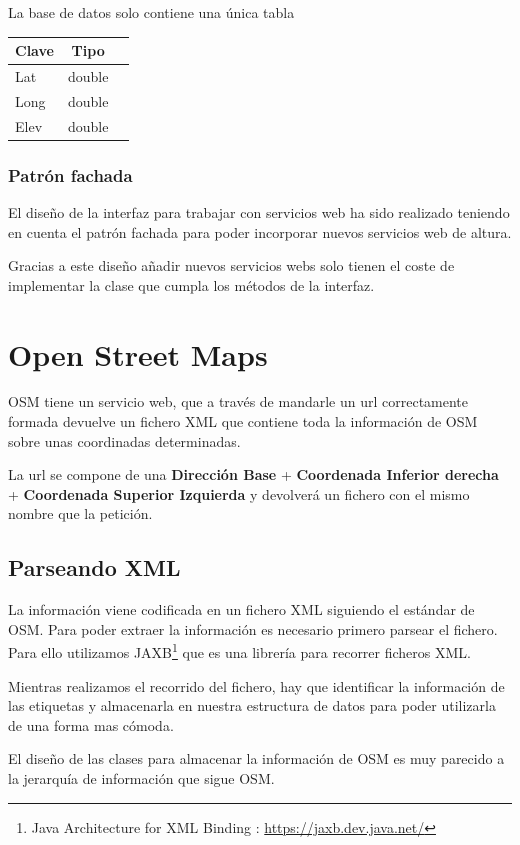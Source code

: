 La base de datos solo contiene una única tabla
\begin{center}
\begin{tabular}{ | l | c | r | }
\hline
Clave & Tipo \\ \hline
Lat & double \\ \hline
Long & double \\ \hline
Elev & double \\ \hline
\end{tabular}
\end{center}


\subsubsection*{Patrón fachada}
El diseño de la interfaz para trabajar con servicios web ha sido realizado
teniendo en cuenta el patrón fachada para poder incorporar nuevos servicios web
de altura.

Gracias a este diseño añadir nuevos servicios webs solo tienen el coste de
implementar la clase que cumpla los métodos de la interfaz.
\section*{Open Street Maps}
OSM tiene un servicio web, que a través de mandarle un url correctamente
formada devuelve un fichero XML que contiene toda la información de OSM sobre
unas coordinadas determinadas.

La url se compone de una {\bf Dirección Base} + {\bf Coordenada Inferior
 derecha} + {\bf Coordenada Superior Izquierda} y devolverá un fichero con el
mismo nombre que la petición.
\subsection*{Parseando XML}
La información viene codificada en un fichero XML siguiendo el estándar de OSM.
Para poder extraer la información es necesario primero parsear el fichero.
Para ello utilizamos JAXB\footnote{Java Architecture for XML Binding :
\url{https://jaxb.dev.java.net/}} que es una librería para recorrer ficheros
XML. 

Mientras realizamos el recorrido del fichero, hay que identificar la
información de las etiquetas y almacenarla en nuestra estructura de datos para
poder utilizarla de una forma mas cómoda.

El diseño de las clases para almacenar la información de OSM es muy parecido a
la jerarquía de información que sigue OSM.


